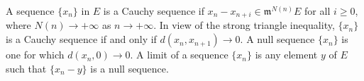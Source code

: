 A sequence $\{x_n\}$ in $E$ is a Cauchy sequence if $x_n - x_{n+i} \in \mathfrak{m}^{N(n)} E$ for all $i \geq 0$, where $N(n) \to +\infty$ as $n \to +\infty$. In view of the strong triangle inequality, $\{x_n\}$ is a Cauchy sequence if and only if $d(x_n, x_{n+1}) \to 0$. A null sequence $\{x_n\}$ is one for which $d(x_n, 0) \to 0$. A limit of a sequence $\{x_n\}$ is any element $y$ of $E$ such that $\{x_n - y\}$ is a null sequence.